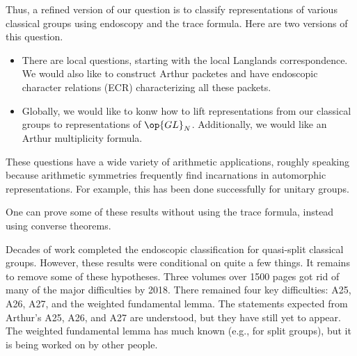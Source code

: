 \documentclass{article}
\begin{document}
Thus, a refined version of our question is to classify representations of various classical groups using endoscopy and the trace formula. Here are two versions of this question.
\begin{itemize}
	\item There are local questions, starting with the local Langlands correspondence. We would also like to construct Arthur packetes and have endoscopic character relations (ECR) characterizing all these packets.
	\item Globally, we would like to konw how to lift representations from our classical groups to representations of $\op{GL}_N$. Additionally, we would like an Arthur multiplicity formula.
\end{itemize}
These questions have a wide variety of arithmetic applications, roughly speaking because arithmetic symmetries frequently find incarnations in automorphic representations. For example, this has been done successfully for unitary groups.
\begin{remark}
	One can prove some of these results without using the trace formula, instead using converse theorems.
\end{remark}
Decades of work completed the endoscopic classification for quasi-split classical groups. However, these results were conditional on quite a few things. It remains to remove some of these hypotheses. Three volumes over 1500 pages got rid of many of the major difficulties by 2018. There remained four key difficulties: A25, A26, A27, and the weighted fundamental lemma. The statements expected from Arthur's A25, A26, and A27 are understood, but they have still yet to appear. The weighted fundamental lemma has much known (e.g., for split groups), but it is being worked on by other people.
\end{document}
